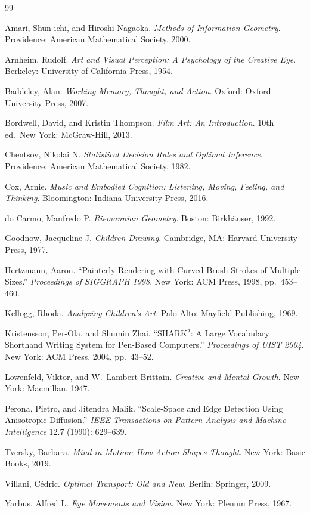 \documentclass[12pt,a4paper]{article}
\theoremstyle{plain}
\theoremstyle{definition}
\begin{document}
\newpage

\begin{thebibliography}{99}

Amari, Shun-ichi, and Hiroshi Nagaoka.
\textit{Methods of Information Geometry}.
Providence: American Mathematical Society, 2000.

Arnheim, Rudolf.
\textit{Art and Visual Perception: A Psychology of the Creative Eye}.
Berkeley: University of California Press, 1954.

Baddeley, Alan.
\textit{Working Memory, Thought, and Action}.
Oxford: Oxford University Press, 2007.

Bordwell, David, and Kristin Thompson.
\textit{Film Art: An Introduction}.
10th ed.\ New York: McGraw-Hill, 2013.

Chentsov, Nikolai N.
\textit{Statistical Decision Rules and Optimal Inference}.
Providence: American Mathematical Society, 1982.

Cox, Arnie.
\textit{Music and Embodied Cognition: Listening, Moving, Feeling, and Thinking}.
Bloomington: Indiana University Press, 2016.

do Carmo, Manfredo P.
\textit{Riemannian Geometry}.
Boston: Birkh\"auser, 1992.

Goodnow, Jacqueline J.
\textit{Children Drawing}.
Cambridge, MA: Harvard University Press, 1977.

Hertzmann, Aaron.
``Painterly Rendering with Curved Brush Strokes of Multiple Sizes.''
\textit{Proceedings of SIGGRAPH 1998}.
New York: ACM Press, 1998, pp.\ 453--460.

Kellogg, Rhoda.
\textit{Analyzing Children's Art}.
Palo Alto: Mayfield Publishing, 1969.

Kristensson, Per-Ola, and Shumin Zhai.
``SHARK$^2$: A Large Vocabulary Shorthand Writing System for Pen-Based
Computers.''
\textit{Proceedings of UIST 2004}.
New York: ACM Press, 2004, pp.\ 43--52.

Lowenfeld, Viktor, and W.\ Lambert Brittain.
\textit{Creative and Mental Growth}.
New York: Macmillan, 1947.

Perona, Pietro, and Jitendra Malik.
``Scale-Space and Edge Detection Using Anisotropic Diffusion.''
\textit{IEEE Transactions on Pattern Analysis and Machine Intelligence}
12.7 (1990): 629--639.

Tversky, Barbara.
\textit{Mind in Motion: How Action Shapes Thought}.
New York: Basic Books, 2019.

Villani, C\'edric.
\textit{Optimal Transport: Old and New}.
Berlin: Springer, 2009.

Yarbus, Alfred L.
\textit{Eye Movements and Vision}.
New York: Plenum Press, 1967.

\end{thebibliography}
\end{document}

